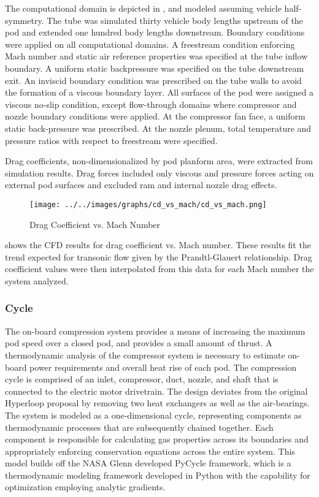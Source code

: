     The computational domain is depicted in ,
    and modeled assuming vehicle half-symmetry.
    The tube was simulated thirty vehicle body lengths upstream of the pod
    and extended one hundred body lengths downstream. Boundary conditions were
    applied on all computational domains. A freestream condition enforcing Mach
    number and static air reference properties was specified at the tube inflow boundary.
    A uniform static backpressure was specified on the tube downstream exit.
    An inviscid boundary condition was prescribed on the tube walls to avoid
    the formation of a viscous boundary layer. All surfaces of the pod were
    assigned a viscous no-slip condition, except flow-through domains where
    compressor and nozzle boundary conditions were applied. At the compressor
    fan face, a uniform static back-pressure was prescribed. At the nozzle plenum,
    total temperature and pressure ratios with respect to freestream were specified.

    Drag coefficients, non-dimensionalized by pod planform area,
    were extracted from simulation results.
    Drag forces included only viscous and pressure forces acting on external
    pod surfaces and excluded ram and internal nozzle drag effects.

    \begin{figure}[!]
      \centering
      \texttt{[image: ../../images/graphs/cd\_vs\_mach/cd\_vs\_mach.png]}
      \caption{Drag Coefficient vs. Mach Number}
      \label{fig:cd_vs_mach}
    \end{figure}
     shows the CFD results for drag coefficient vs. Mach number.
    These results fit the trend expected for transonic flow given by the
    Prandtl-Glauert relationship. Drag coefficient values were then interpolated
    from this data for each Mach number the system analyzed.
  \subsubsection{Cycle}
    The on-board compression system provides a means of increasing the maximum
    pod speed over a closed pod,  and provides a small amount of thrust.
    A thermodynamic analysis of the compressor system is necessary to estimate
    on-board power requirements and overall heat rise of each pod.
    The compression cycle is comprised of an inlet, compressor, duct, nozzle,
    and shaft that is connected to the electric motor drivetrain. The design
    deviates from the original Hyperloop proposal by removing two heat
    exchangers as well as the air-bearings. The system is modeled as a
    one-dimensional cycle, representing components as thermodynamic processes
    that are subsequently chained together. Each component is responsible for
    calculating gas properties across its boundaries and appropriately enforcing
    conservation equations across the entire system. This model builds off the
    NASA Glenn developed PyCycle framework, which is a thermodynamic modeling
    framework developed in Python with the capability for optimization
    employing analytic gradients. \cite{PyCycle}
